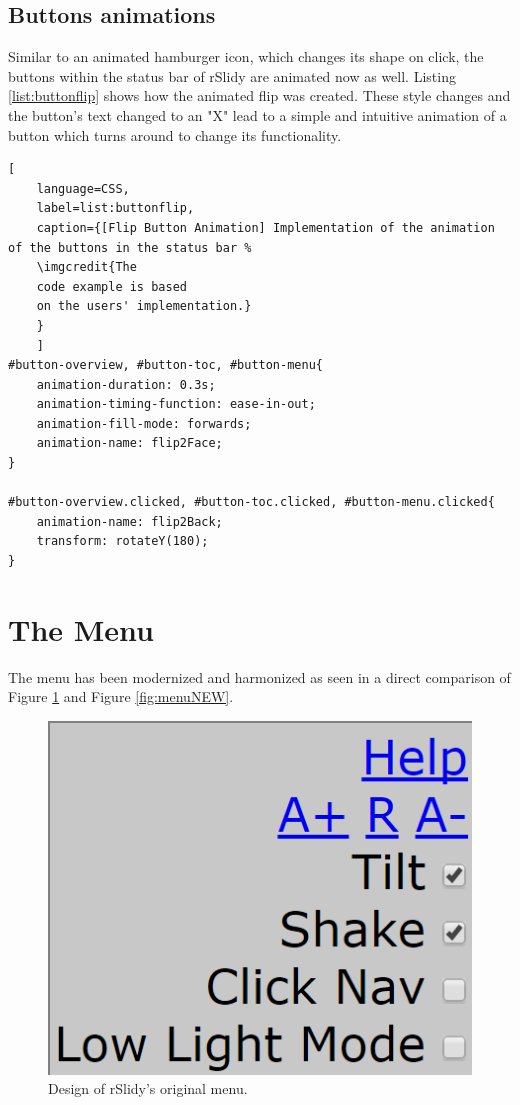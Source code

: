 \subsection{Buttons animations}
Similar to an animated hamburger icon, which changes its shape on click, the buttons within the status bar of rSlidy are animated now as well. Listing \ref{list:buttonflip} shows how the animated flip was created. These style changes and the button's text changed to an "X" lead to a simple and intuitive animation of a button which turns around to change its functionality. 

\begin{minipage}{\linewidth}
	\begin{lstlisting}[
	language=CSS,
	label=list:buttonflip,
	caption={[Flip Button Animation] Implementation of the animation of the buttons in the status bar %
	\imgcredit{The 
	code example is based 
	on the users' implementation.}
	}
	]
#button-overview, #button-toc, #button-menu{ 
	animation-duration: 0.3s; 
	animation-timing-function: ease-in-out;
	animation-fill-mode: forwards;
	animation-name: flip2Face;
}

#button-overview.clicked, #button-toc.clicked, #button-menu.clicked{
	animation-name: flip2Back; 
	transform: rotateY(180);
}
	\end{lstlisting}
\end{minipage}






\section{The Menu}
The menu has been modernized and harmonized as seen in a direct comparison of Figure \ref{fig:menuOLD} and Figure \ref{fig:menuNEW}.

\begin{figure}[tp]
	\centering
	\includegraphics[width = .4\textwidth]{images/menu_old.png}
	
	\caption[Original Menu]{
		Design of rSlidy's original menu.
	}
	\label{fig:menuOLD}
\end{figure}

